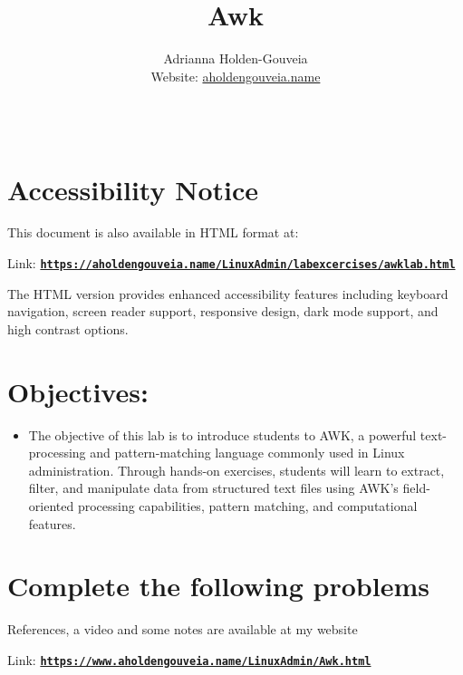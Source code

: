 \documentclass[12pt]{article}
\title{Awk}
\author{
        Adrianna Holden-Gouveia \\
        Website: \href{https://aholdengouveia.name}{aholdengouveia.name}\\ 
        \date{\vspace{-5ex}}
        \faGithub {: aholdengouveia} \\
        }
\begin{document}
    

\maketitle


\section*{Accessibility Notice}
This document is also available in HTML format at:

Link: \href{https://aholdengouveia.name/LinuxAdmin/labexcercises/awklab.html}{\textbf{\nolinkurl{https://aholdengouveia.name/LinuxAdmin/labexcercises/awklab.html}}}

The HTML version provides enhanced accessibility features including keyboard navigation, screen reader support, responsive design, dark mode support, and high contrast options.

\section*{Objectives:}
\begin{itemize}
    \item The objective of this lab is to introduce students to AWK, a powerful text-processing and pattern-matching language commonly used in Linux administration. Through hands-on exercises, students will learn to extract, filter, and manipulate data from structured text files using AWK's field-oriented processing capabilities, pattern matching, and computational features.
\end{itemize}
\section*{Complete the following problems}

References, a video and some notes are available at my website

Link: \href{https://www.aholdengouveia.name/LinuxAdmin/Awk.html}{\textbf{\nolinkurl{https://www.aholdengouveia.name/LinuxAdmin/Awk.html}}}
\end{document}
